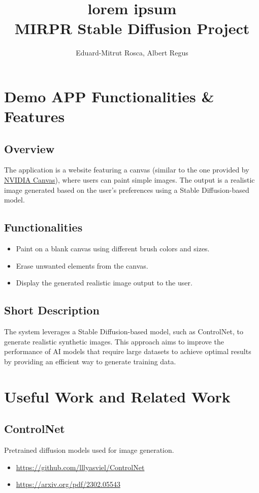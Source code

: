 \documentclass[12pt,a4paper]{report}
\title{lorem ipsum \\ \large MIRPR Stable Diffusion Project}
\author{Eduard-Mitrut Rosca, Albert Regus}
\begin{document}
\maketitle

\chapter*{Demo APP Functionalities \& Features}

\section*{Overview}
The application is a website featuring a canvas (similar to the one provided by \href{https://www.nvidia.com/en-us/studio/canvas/}{NVIDIA Canvas}), where users can paint simple images. The output is a realistic image generated based on the user’s preferences using a Stable Diffusion-based model.

\section*{Functionalities}
\begin{itemize}
    \item Paint on a blank canvas using different brush colors and sizes.
    \item Erase unwanted elements from the canvas.
    \item Display the generated realistic image output to the user.
\end{itemize}

\section*{Short Description}
The system leverages a Stable Diffusion-based model, such as ControlNet, to generate realistic synthetic images. This approach aims to improve the performance of AI models that require large datasets to achieve optimal results by providing an efficient way to generate training data.

\chapter*{Useful Work and Related Work}

\section*{ControlNet}
Pretrained diffusion models used for image generation.
\begin{itemize}
    \item \href{https://github.com/lllyasviel/ControlNet}{https://github.com/lllyasviel/ControlNet}
    \item \href{https://arxiv.org/pdf/2302.05543}{https://arxiv.org/pdf/2302.05543}
\end{itemize}
\end{document}
